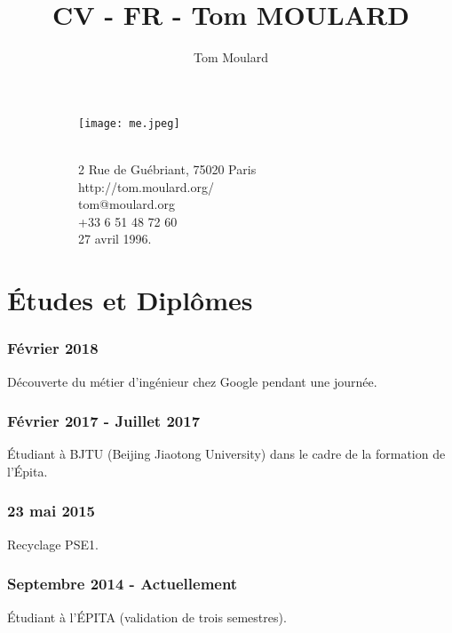 \documentclass{article}
\begin{document}
    \title{CV - FR - Tom MOULARD}

    \author{Tom Moulard}

    \begin{center}
        \begin{figure}
            \centering
            \begin{subfigure}[b]{0.3\textwidth}
                \texttt{[image: me.jpeg]}
            \end{subfigure}
            \begin{subfigure}[b]{0.3\textwidth}
                {\huge\bfseries\theauthor}\\
                \vspace{.25em}
                2 Rue de Gu\'ebriant, 75020 Paris\\
                http://tom.moulard.org/\\
                tom@moulard.org\\
                +33 6 51 48 72 60\\
                27 avril 1996.
            \end{subfigure}
        \end{figure}
    \end{center}

    \hspace{-.25em}
    \section{\'Etudes et Dipl\^omes}
        \subsubsection{F\'evrier 2018}
            D\'ecouverte du m\'etier d'ing\'enieur chez Google pendant une journ\'ee.
        \subsubsection{F\'evrier 2017 - Juillet 2017}
            \'Etudiant \`a BJTU (Beijing Jiaotong University) dans le cadre de la formation de l'\'Epita.
        \subsubsection{23 mai 2015}
            Recyclage PSE1.
        \subsubsection{Septembre 2014 - Actuellement}
            \'Etudiant \`a l'\'EPITA (validation de trois semestres).
\end{document}
